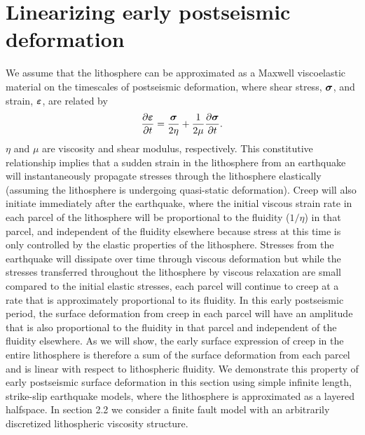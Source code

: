 \documentclass[extra]{gji}
\begin{document}
\section{Linearizing early postseismic deformation} 
We assume that the lithosphere can be approximated as a Maxwell
viscoelastic material on the timescales of postseismic deformation,
where shear stress, $\mitbf{\sigma}$, and strain,
$\mitbf{\varepsilon}$, are related by
\begin{equation}
  \frac{\partial\mitbf{\varepsilon}}{\partial t}=\frac{\mitbf{\sigma}}{2\eta} + 
                              \frac{1}{2\mu}\frac{\partial\mitbf{\sigma}}{\partial t}.
\end{equation}
$\eta$ and $\mu$ are viscosity and shear modulus, respectively.  This
constitutive relationship implies that a sudden strain in the
lithosphere from an earthquake will instantaneously propagate stresses
through the lithosphere elastically (assuming the lithosphere is
undergoing quasi-static deformation).  Creep will also initiate
immediately after the earthquake, where the initial viscous strain
rate in each parcel of the lithosphere will be proportional to the
fluidity ($1/\eta$) in that parcel, and independent of the fluidity
elsewhere because stress at this time is only controlled by the
elastic properties of the lithosphere.  Stresses from the earthquake
will dissipate over time through viscous deformation but while the
stresses transferred throughout the lithosphere by viscous relaxation
are small compared to the initial elastic stresses, each parcel will
continue to creep at a rate that is approximately proportional to its
fluidity.  In this early postseismic period, the surface deformation
from creep in each parcel will have an amplitude that is also
proportional to the fluidity in that parcel and independent of the
fluidity elsewhere.  As we will show, the early surface expression of
creep in the entire lithosphere is therefore a sum of the surface
deformation from each parcel and is linear with respect to
lithospheric fluidity.  We demonstrate this property of early
postseismic surface deformation in this section using simple infinite
length, strike-slip earthquake models, where the lithosphere is
approximated as a layered halfspace. In section 2.2 we consider a
finite fault model with an arbitrarily discretized lithospheric
viscosity structure.
\end{document}
